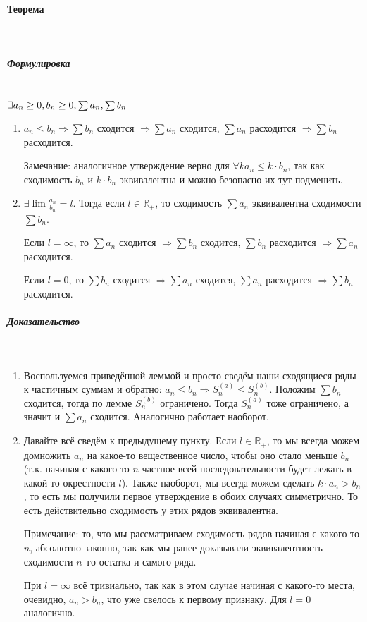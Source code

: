 \documentclass{article}
\def\letus{%
\mathord{\setbox0=\hbox{$\exists$}%
         \hbox{\kern 0.125\wd0%
               \vbox to \ht0{%
                  \hrule width 0.75\wd0%
                  \vfill%
                  \hrule width 0.75\wd0}%
               \vrule height \ht0%
               \kern 0.125\wd0}%
       }%
        }
\let\vanillaparagraph\paragraph
\let\vanillasubparagraph\subparagraph
\renewcommand{\paragraph}[1]{\vanillaparagraph{#1}\mbox{}\\}
\renewcommand{\subparagraph}[1]{\vanillasubparagraph{#1}\mbox{}\\}
\begin{document}
\paragraph{Теорема}
\subparagraph{Формулировка}
$\letus a_n \ge 0, b_n \ge 0, \sum a_n, \sum b_n$
\begin{enumerate}
    \item $a_n \le b_n \Rightarrow \sum b_n$ сходится $\Rightarrow \sum a_n$ сходится, $\sum a_n$ расходится $\Rightarrow \sum b_n$ расходится. 
    
    Замечание: аналогичное утверждение верно для $\forall k a_n \le k \cdot b_n$, так как сходимость $b_n$ и $k \cdot b_n$ эквивалентна и можно безопасно их тут подменить.
    
    \item $\exists \lim \frac{a_n}{b_n} = l$. Тогда 
    если $l \in \mathbb{R}_+$, то сходимость $\sum a_n$ эквивалентна сходимости $\sum b_n$.

    Если $l = \infty$, то $\sum a_n$ сходится $\Rightarrow \sum b_n$ сходится, $\sum b_n$ расходится $\Rightarrow \sum a_n$ расходится.
    
    Если $l = 0$, то $\sum b_n$ сходится $\Rightarrow \sum a_n$ сходится, $\sum a_n$ расходится $\Rightarrow \sum b_n$ расходится.
\end{enumerate}

\subparagraph{Доказательство}
\begin{enumerate}
    \item Воспользуемся приведённой леммой и просто сведём наши сходящиеся ряды к частичным суммам и обратно:
    $a_n \le b_n \Rightarrow S_n^{(a)} \le S_n^{(b)}$. Положим $\sum b_n$ сходится, тогда по лемме $S_n^{(b)}$ ограничено. Тогда $S_n^{(a)}$ тоже ограничено, а значит и $\sum a_n$ сходится. Аналогично работает наоборот.
    
    \item Давайте всё сведём к предыдущему пункту. Если $l \in \mathbb{R}_+$, то мы всегда можем домножить $a_n$ на какое-то вещественное число, чтобы оно стало меньше $b_n$ (т.к. начиная с какого-то $n$ частное всей последовательности будет лежать в какой-то окрестности $l$). Также наоборот, мы всегда можем сделать $k \cdot a_n > b_n$, то есть мы получили первое утверждение в обоих случаях симметрично. То есть действительно сходимость у этих рядов эквивалентна. 
    
    Примечание: то, что мы рассматриваем сходимость рядов начиная с какого-то $n$, абсолютно законно, так как мы ранее доказывали эквивалентность сходимости $n$--го остатка и самого ряда.
    
    При $l = \infty$ всё тривиально, так как в этом случае начиная с какого-то места, очевидно, $a_n > b_n$, что уже свелось к первому признаку. Для $l = 0$ аналогично.
\end{enumerate}
\end{document}
